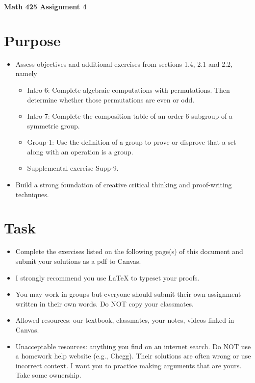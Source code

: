 \documentclass[12pt]{article}
\begin{document}
	\begin{center}
		{\Large \bf Math 425 Assignment 4}
	\end{center}
	\section*{Purpose}
		\begin{itemize}
			\item Assess objectives and additional exercises from sections 1.4, 2.1 and 2.2, namely
				\begin{itemize}
					\item Intro-6: Complete algebraic computations with permutations. Then determine whether those permutations are even or odd.
					\item Intro-7: Complete the composition table of an order 6 subgroup of a symmetric group.
					\item Group-1: Use the definition of a group to prove or disprove that a set along with an operation is a group.
					\item Supplemental exercise Supp-9. 
				\end{itemize}
			\item Build a strong foundation of creative critical thinking and proof-writing techniques.
		\end{itemize}
	\section*{Task}
		\begin{itemize}
			\item Complete the exercises listed on the following page(s) of this document and submit your solutions as a pdf to Canvas.
			\item I strongly recommend you use LaTeX to typeset your proofs.
			\item You may work in groups but everyone should submit their own assignment written in their own words.  Do NOT copy your classmates.
			\item Allowed resources: our textbook, classmates, your notes, videos linked in Canvas.
			\item Unacceptable resources: anything you find on an internet search. Do NOT use a homework help website (e.g., Chegg). Their solutions are often wrong or use incorrect context.  I want you to practice making arguments that are yours. Take some ownership.
		\end{itemize}
\end{document}
